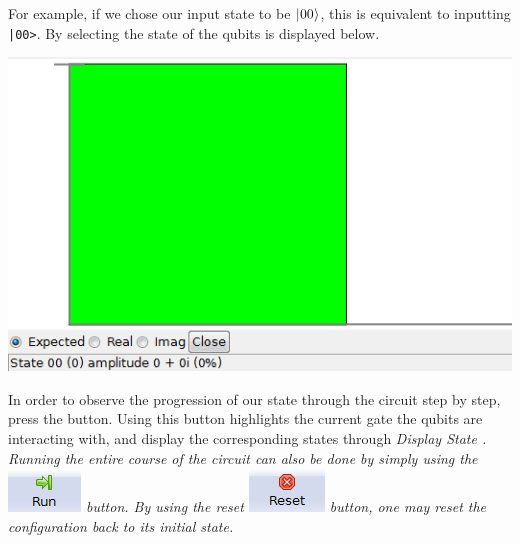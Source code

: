 \documentclass[10pt]{article}
\theoremstyle{definition}
\newcommand{\microspace}{\mspace{0.5mu}}
\def \lket {\left|}
\def \rket {\right\rangle}
\newcommand{\ket}[1]{\lket\microspace #1 \microspace\rket}
\begin{document}
For example, if we chose our input state to be $\ket{00}$, this is equivalent to 
inputting \verb+|00>+. By selecting
the state of the qubits is displayed below.

\begin{center}
\includegraphics{Figures/CreateCircuit/DisplayState.png}
\end{center}

In order to observe the progression of our state through the circuit step by step, press the  button. Using this button highlights the current gate the qubits are interacting with, and display the corresponding states through \em Display State \em. Running the entire course of the circuit can also be done by simply using the \includegraphics[scale=0.60]{Figures/Navigation/Run.png} button. By using the reset \includegraphics[scale=0.60]{Figures/Navigation/Reset.png} button, one may reset the configuration back to its initial state.
\end{document}
